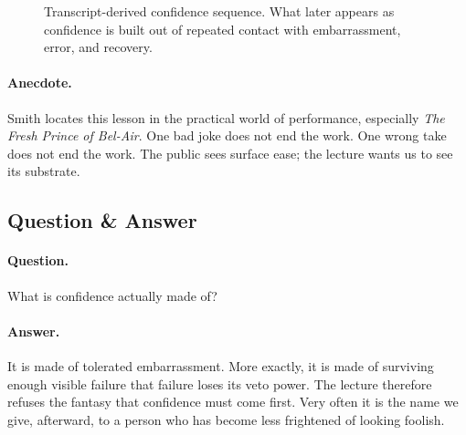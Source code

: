 \begin{figure}[h]
\centering
{}
\caption{Transcript-derived confidence sequence. What later appears as confidence is built out of repeated contact with embarrassment, error, and recovery.}
\end{figure}

\paragraph{Anecdote.}
Smith locates this lesson in the practical world of performance, especially \emph{The Fresh Prince of Bel-Air}. One bad joke does not end the work. One wrong take does not end the work. The public sees surface ease; the lecture wants us to see its substrate.

\subsection{Question \& Answer}

\paragraph{Question.}
What is confidence actually made of?

\paragraph{Answer.}
It is made of tolerated embarrassment. More exactly, it is made of surviving enough visible failure that failure loses its veto power. The lecture therefore refuses the fantasy that confidence must come first. Very often it is the name we give, afterward, to a person who has become less frightened of looking foolish.

